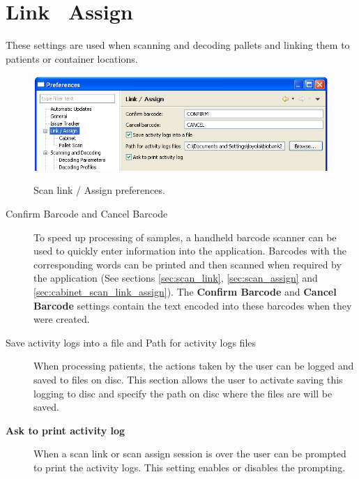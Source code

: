 \section{Link \ Assign}
These settings are used when scanning and decoding pallets and linking them to
patients or container locations.
    \begin{figure}[H]
      \centering
      \scalebox{0.5}
      { \includegraphics*{screenshots/configuration/prefs_link_assign} }
      \caption{Scan link / Assign preferences.}
      \label{fig:prefs_link_assign}
    \end{figure}
\begin{description}
  \item[Confirm Barcode and Cancel Barcode] To speed up processing of samples,
    a handheld barcode scanner can be used to quickly enter information into
    the application. Barcodes with the corresponding words can be printed and
    then scanned when required by the application (See sections
    \ref{sec:scan_link}, \ref{sec:scan_assign} and
    \ref{sec:cabinet_scan_link_assign}). The \textbf{Confirm Barcode} and
    \textbf{Cancel Barcode} settings contain the text encoded into these
    barcodes when they were created. %
  \item [Save activity logs into a file and Path for activity logs files] When
    processing patients, the actions taken by the user can be logged and saved
    to files on disc. This section allows the user to activate saving this
    logging to disc and specify the path on disc where the files are will be
    saved.
  \item[\textbf{Ask to print activity log}] When a scan link or scan assign
    session is over the user can be prompted to print the activity logs. This
    setting enables or disables the prompting.
\end{description}

